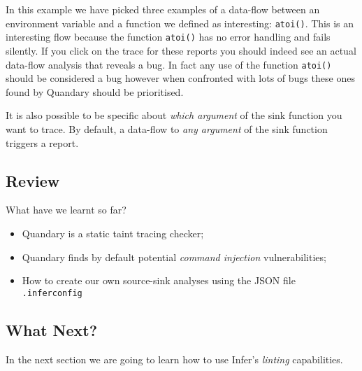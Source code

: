 In this example we have picked three examples of a data-flow between an environment variable
and a function we defined as interesting: \verb|atoi()|. This is an interesting flow because
the function \verb|atoi()| has no error handling and fails silently. 
If you click on the trace for these reports you should indeed see an actual data-flow analysis
that reveals a bug. In fact any use of the function \verb|atoi()| should be considered a bug
however when confronted with lots of bugs these ones found by Quandary should be prioritised.

It is also possible to be specific about \textit{which argument} of the sink function you want 
to trace. By default, a data-flow to \textit{any argument} of the sink function triggers a report.


\subsection{Review}

What have we learnt so far?

\begin{itemize}
	\item Quandary is a static taint tracing checker;
	\item Quandary finds by default potential \textit{command injection} vulnerabilities;
	\item How to create our own source-sink analyses using the JSON file \verb|.inferconfig|
\end{itemize}


\subsection{What Next?}

In the next section we are going to learn how to use Infer's \textit{linting} capabilities.